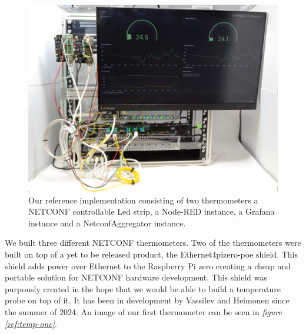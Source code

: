 \documentclass[12pt]{article}
\begin{document}
\begin{figure}
  \centering
  \includegraphics[width=\textwidth]{setup.jpg}
  \caption{Our reference implementation consisting of two thermometers a NETCONF controllable Led strip, a Node-RED instance, a Grafana instance and a NetconfAggregator instance.}
  \label{ref:reference-implementation}
\end{figure}

\newpage
We built three different NETCONF thermometers. Two of the thermometers were built on top of 
a yet to be released product, the Ethernet4pizero-poe shield. This shield adds 
power over Ethernet to the Raspberry Pi zero creating a cheap and portable solution 
for NETCONF hardware development. This shield was purpously created in the hope that 
we would be able to build a temperature probe on top of it. It has been in development by 
Vassilev and Heimonen since the summer of 2024. An image of our first thermometer can be seen in 
\textit{figure \ref{ref:temp-one}}.
\end{document}
